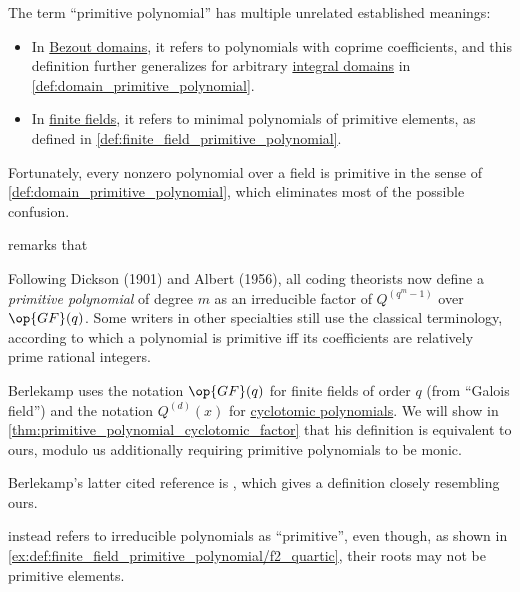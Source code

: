 \begin{remark}\label{rem:primitive_polynomial_terminology}
  The term \enquote{primitive polynomial} has multiple unrelated established meanings:
  \begin{itemize}
    \item In \hyperref[def:bezout_domain]{Bezout domains}, it refers to polynomials with coprime coefficients, and this definition further generalizes for arbitrary \hyperref[def:integral_domain]{integral domains} in \cref{def:domain_primitive_polynomial}.

    \item In \hyperref[def:finite_field]{finite fields}, it refers to minimal polynomials of primitive elements, as defined in \cref{def:finite_field_primitive_polynomial}.
  \end{itemize}

  Fortunately, every nonzero polynomial over a field is primitive in the sense of \cref{def:domain_primitive_polynomial}, which eliminates most of the possible confusion.

  \textcite[106]{Berlekamp2015AlgebraicCodingTheory} remarks that
  \begin{displayquote}
    Following Dickson (1901) and Albert (1956), all coding theorists now define a \textit{primitive polynomial} of degree \( m \) as an irreducible factor of \( Q^{(q^m - 1)} \) over \( \op{GF}(q) \). Some writers in other specialties still use the classical terminology, according to which a polynomial is primitive iff its coefficients are relatively prime rational integers.
  \end{displayquote}

  Berlekamp uses the notation \( \op{GF}(q) \) for finite fields of order \( q \) (from \enquote{Galois field}) and the notation \( Q^{(d)}(x) \) for \hyperref[def:cyclotomic_polynomial]{cyclotomic polynomials}. We will show in \cref{thm:primitive_polynomial_cyclotomic_factor} that his definition is equivalent to ours, modulo us additionally requiring primitive polynomials to be monic.

  Berlekamp's latter cited reference is \cite{Albert1956HigherAlgebra}, which gives a definition closely resembling ours.

  \textcite[38]{Gentle2006RandomNumberGeneration} instead refers to irreducible polynomials as \enquote{primitive}, even though, as shown in \cref{ex:def:finite_field_primitive_polynomial/f2_quartic}, their roots may not be primitive elements.
\end{remark}

